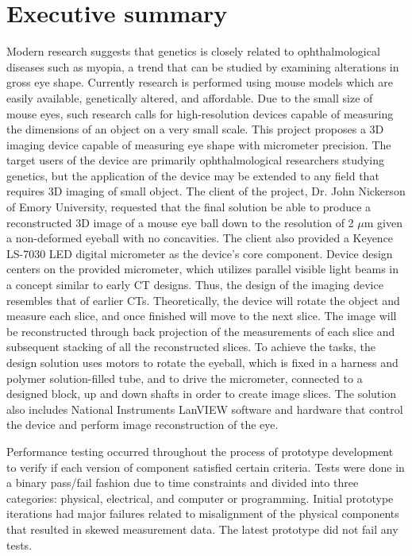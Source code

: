 \documentclass{article}
\begin{document}

\setcounter{tocdepth}{3}
\tableofcontents
\newpage

\section*{Executive summary}
\label{sec:exec-summary}

Modern research suggests that genetics is closely related to ophthalmological diseases such as 
myopia, a trend that can be studied by examining alterations in gross eye shape. Currently research is performed using mouse models which are easily available, genetically altered, and affordable. Due to the small size of mouse eyes, such research calls for high-resolution devices capable of measuring the dimensions of an object on a very small scale. This project proposes a 3D imaging device capable of 
measuring eye shape with micrometer precision. The target users of the device are primarily ophthalmological researchers studying genetics, but the application of the device may be extended to any field that requires 3D imaging of small object. 
The client of the project, Dr. John Nickerson of Emory University, requested that the final solution be able to produce a reconstructed 3D image of a mouse eye ball down to the resolution of 2 $\mu$m given a non-deformed eyeball with no concavities. The client also provided a Keyence LS-7030 LED digital micrometer as the  device’s core component. Device design centers on the provided micrometer, which utilizes parallel visible light beams in a concept  similar to early CT
designs. Thus, the design of the imaging device resembles that of earlier CTs. Theoretically, 
the device will rotate the object and measure each slice, and once finished will move to the 
next slice. The image will be reconstructed through back projection of the 
measurements of each slice and subsequent stacking of all the reconstructed slices. To achieve 
the tasks, the design solution uses motors to rotate the eyeball, which is fixed in a 
harness and polymer solution-filled tube, and to drive the micrometer, connected to a designed block, up and down shafts in order to create image slices. The solution also includes National Instruments LanVIEW software and hardware that control the device and perform image reconstruction of the eye.

Performance testing occurred throughout the process of prototype development to 
verify if each version of component satisfied certain criteria. Tests were done in a binary pass/fail fashion due to time constraints and divided into three categories: physical, electrical, and computer or programming. Initial prototype iterations had major failures related to misalignment of the physical components that resulted in skewed measurement data. The latest prototype did not fail any tests.
\end{document}
